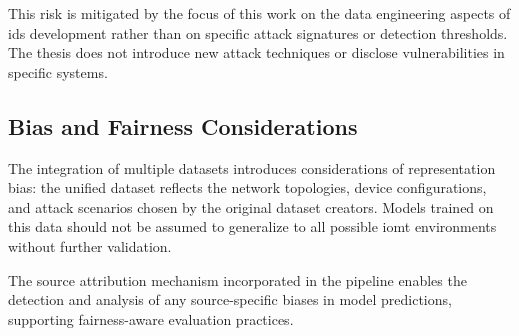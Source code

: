 This risk is mitigated by the focus of this work on the data engineering aspects of \gls{ids} development rather than on specific attack signatures or detection thresholds. The thesis does not introduce new attack techniques or disclose vulnerabilities in specific systems.

\subsection{Bias and Fairness Considerations}

The integration of multiple datasets introduces considerations of representation bias: the unified dataset reflects the network topologies, device configurations, and attack scenarios chosen by the original dataset creators. Models trained on this data should not be assumed to generalize to all possible \gls{iomt} environments without further validation.

The source attribution mechanism incorporated in the pipeline enables the detection and analysis of any source-specific biases in model predictions, supporting fairness-aware evaluation practices.
